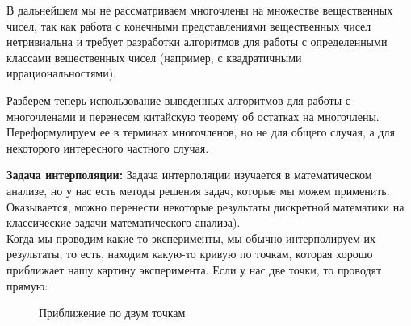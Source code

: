 \documentclass[russian]{lecture-notes}
\theoremstyle{definition}
\begin{document}
    \begin{note}
        В дальнейшем мы не рассматриваем многочлены на множестве вещественных чисел, так как работа с конечными представлениями вещественных чисел нетривиальна и требует разработки алгоритмов для работы с определенными классами вещественных чисел (например, с квадратичными иррациональностями).
    \end{note}

    Разберем теперь использование выведенных алгоритмов для работы с многочленами и перенесем китайскую теорему об остатках на многочлены. Переформулируем ее в терминах многочленов, но не для общего случая, а для некоторого интересного частного случая.

    \noindent\textbf{Задача интерполяции:} Задача интерполяции изучается в математическом анализе, но у нас есть методы решения задач, которые мы можем применить. Оказывается, можно перенести некоторые результаты дискретной математики на классические задачи математического анализа). \\

    Когда мы проводим какие-то эксперименты, мы обычно интерполируем их результаты, то есть, находим какую-то кривую по точкам, которая хорошо приближает нашу картину эксперимента. Если у нас две точки, то проводят прямую:
    \begin{figure}[H]
        \begin{subfigure}[H]{0.49\linewidth}
            \centering
        \end{subfigure}
        \hfill
        \begin{subfigure}[H]{0.49\linewidth}
            \centering
        \end{subfigure}
        \caption{\small Приближение по двум точкам}
    \end{figure}
\end{document}

